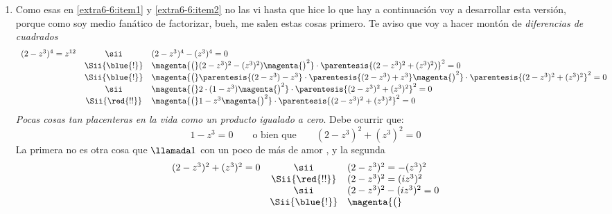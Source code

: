\begin{enumerate}[label=\faIcon{magic}$_{\arabic*}$)]
  \item\label{extra6-6:item3} Como esas en \ref{extra6-6:item1} y \ref{extra6-6:item2} no las vi hasta que hice lo que hay
        a continuación voy a desarrollar esta versión, porque como soy medio fanático de factorizar,
        bueh, me salen estas cosas primero.
        Te aviso que voy a hacer montón de \textit{diferencias de cuadrados\blue{!}}
        $$
          \begin{array}{rcl}
            (2-z^3)^4 = z^{12}
             & \sii           &
            (2-z^3)^4 - (z^3)^4 = 0 \\
             & \Sii{\blue{!}} &
            \magenta{\big(}
            (2-z^3)^2 - (z^3)^2 )
            \magenta{\big)^2}
            \cdot
            \parentesis{(2-z^3)^2 + (z^3)^2)}^2
            = 0                     \\
             & \Sii{\blue{!}} &
            \magenta{\big(}\parentesis{(2-z^3) - z^3}
            \cdot
            \parentesis{(2-z^3) + z^3}
            \magenta{\big)^2}
            \cdot
            \parentesis{(2-z^3)^2 + (z^3)^2}^2
            = 0                     \\
             & \sii           &
            \magenta{\big(}
            2 \cdot (1-z^3)
            \magenta{\big)^2}
            \cdot
            \parentesis{(2-z^3)^2 + (z^3)^2}^2
            = 0                     \\
             & \Sii{\red{!!}} &
            \magenta{\big(}
            1 - z^3
            \magenta{\big)^2}
            \cdot
            \parentesis{(2-z^3)^2 + (z^3)^2}^2
            = 0
          \end{array}
        $$
        \textit{Pocas cosas tan placenteras en la vida como un producto igualado a cero}. Debe ocurrir que:
        $$
          1 - z^3 = 0
          \qquad \text{o bien que} \qquad
          (2-z^3)^2 + (z^3)^2 = 0
        $$
        La primera no es otra cosa que $\llamada1$ con un poco de más de amor {\tiny{}},
        y la segunda
        $$
          \begin{array}{rcl}
            (2-z^3)^2 + (z^3)^2 = 0
             & \sii           &
            (2 - z^3)^2  = - (z^3)^2    \\
             & \Sii{\red{!!}} &
            (2 - z^3)^2  = (iz^3)^2     \\
             & \sii           &
            (2 - z^3)^2  - (iz^3)^2 = 0 \\
             & \Sii{\blue{!}} &
            \magenta{\big(}

\end{array}$$
\end{enumerate}
